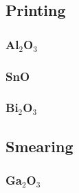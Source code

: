 \documentclass[../Matt_Gebert_Honours_Thesis.tex]{subfiles}
\begin{document}
	\subsection{Printing}
	\subsubsection{Al$_2$O$_3$}
	\subsubsection{SnO}
	\subsubsection{Bi$_2$O$_3$}
	
	\subsection{Smearing}
	\subsubsection{Ga$_2$O$_3$}
	
\end{document}
